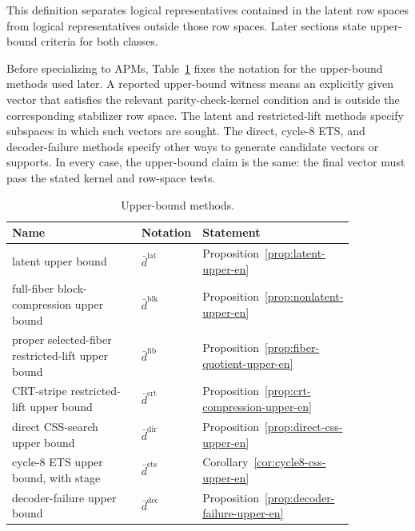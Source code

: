 \documentclass[11pt]{article}
\newcommand{\dbound}[1]{\ensuremath{\bar{d}^{\mathrm{#1}}}}
\newcommand{\dlat}{\dbound{lat}}
\newcommand{\dblk}{\dbound{blk}}
\newcommand{\dfib}{\dbound{fib}}
\newcommand{\dcrt}{\dbound{crt}}
\newcommand{\ddir}{\dbound{dir}}
\newcommand{\dets}{\dbound{ets}}
\newcommand{\ddec}{\dbound{dec}}
\newcommand{\markededit}[1]{#1}
\theoremstyle{uprightthm}
\begin{document}
This definition separates logical representatives contained in the latent row
spaces from logical representatives outside those row spaces.  Later sections
state upper-bound criteria for both classes.

Before specializing to APMs, Table~\ref{tab:upper-bound-methods-en} fixes the
notation for the upper-bound methods used later.  A reported upper-bound
witness means an explicitly given vector that satisfies the relevant
parity-check-kernel condition and is outside the corresponding stabilizer row
space.  The latent and restricted-lift methods specify subspaces in which such
vectors are sought.  The direct, cycle-8 ETS, and decoder-failure methods
specify other ways to generate candidate vectors or supports.  In every case,
the upper-bound claim is the same: the final vector must pass the stated kernel
and row-space tests.

\begin{table}[t]
\centering
\caption{Upper-bound methods.}
\label{tab:upper-bound-methods-en}
\small
\setlength{\tabcolsep}{5pt}
\renewcommand{\arraystretch}{1.12}
\begin{tabular}{p{0.38\linewidth}p{0.17\linewidth}p{0.30\linewidth}}
\toprule
Name & Notation & Statement \\
\midrule
latent upper bound & \dlat & Proposition~\ref{prop:latent-upper-en} \\
full-fiber block-compression upper bound & \dblk & Proposition~\ref{prop:nonlatent-upper-en} \\
\markededit{proper selected-fiber restricted-lift upper bound} & \dfib & Proposition~\ref{prop:fiber-quotient-upper-en} \\
CRT-stripe restricted-lift upper bound & \dcrt & Proposition~\ref{prop:crt-compression-upper-en} \\
direct CSS-search upper bound & \ddir & Proposition~\ref{prop:direct-css-upper-en} \\
cycle-8 ETS upper bound, with stage & \dets & Corollary~\ref{cor:cycle8-css-upper-en} \\
decoder-failure upper bound & \ddec & Proposition~\ref{prop:decoder-failure-upper-en} \\
\bottomrule
\end{tabular}
\end{table}
\end{document}
